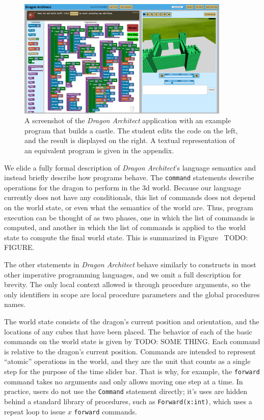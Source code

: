 \documentclass{sig-alternate}
\newcommand{\da}{\emph{Dragon Architect}}
\newcommand{\todo}[1]{{\color{red} TODO: #1}}
\begin{document}
\begin{figure}[t!]
  \centering
  \includegraphics[width=0.9\textwidth]{images/full-castle}
  \caption{A screenshot of the \da{} application with an example program that builds a castle. The student edits the code on the left, and the result is displayed on the right. A textual representation of an equivalent program is given in the appendix.}
  \label{fig:full-program}
\end{figure}

We elide a fully formal description of \da's language semantics and instead briefly describe how programs behave. The \texttt{command} statements describe operations for the dragon to perform in the 3d world. Because our language currently does not have any conditionals, this list of commands does not depend on the world state, or even what the semantics of the world are. Thus, program execution can be thought of as two phases, one in which the list of commands is computed, and another in which the list of commands is applied to the world state to compute the final world state. This is summarized in Figure~\todo{FIGURE}.

The other statements in \da{} behave similarly to constructs in most other imperative programming languages, and we omit a full description for brevity. The only local context allowed is through procedure arguments, so the only identifiers in scope are local procedure parameters and the global procedures names.

The world state consists of the dragon's current position and orientation, and the locations of any cubes that have been placed.  The behavior of each of the basic commands on the world state is given by \todo{SOME THING}. Each command is relative to the dragon's current position. Commands are intended to represent ``atomic'' operations in the world, and they are the unit that counts as a single step for the purpose of the time slider bar. That is why, for example, the \texttt{forward} command takes no arguments and only allows moving one step at a time. In practice, users do not use the \texttt{Command} statement directly; it's uses are hidden behind a standard library of procedures, such as \texttt{Forward(x:int)}, which uses a repeat loop to issue $x$ \texttt{forward} commands.
\end{document}
